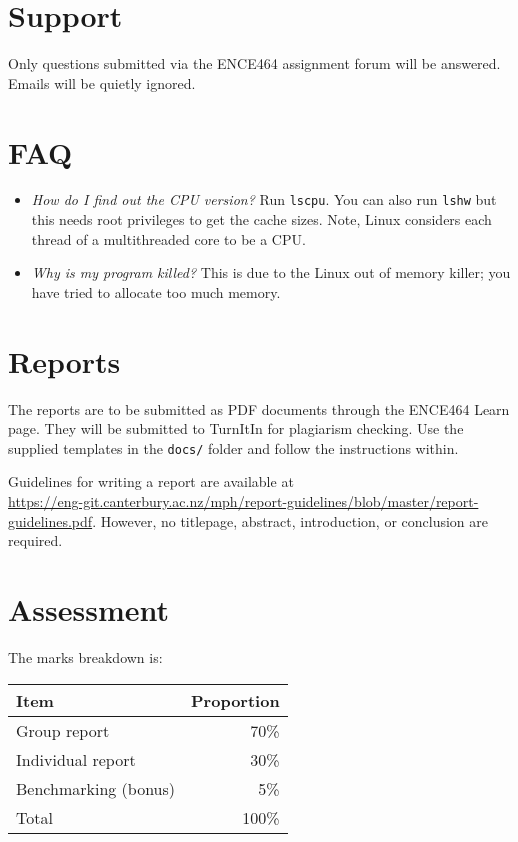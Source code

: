 \documentclass[a4paper,11pt]{article}
\newcommand{\code}[1]{\texttt{#1}}
\begin{document}

\section{Support}

Only questions submitted via the ENCE464 assignment forum will be
answered.  Emails will be quietly ignored.


\section{FAQ}

\begin{itemize}
\item \emph{How do I find out the CPU version?}  Run \code{lscpu}.
  You can also run \code{lshw} but this needs root privileges to get
  the cache sizes.  Note, Linux considers each thread of a
  multithreaded core to be a CPU.

\item \emph{Why is my program killed?}  This is due to the Linux out
  of memory killer; you have tried to allocate too much memory.

\end{itemize}



\section{Reports}

The reports are to be submitted as PDF documents through the ENCE464 
Learn page.  They will be submitted to TurnItIn for plagiarism checking.
Use the supplied templates in the \code{docs/} folder and follow the 
instructions within.

Guidelines for writing a report are available
at\\ \url{https://eng-git.canterbury.ac.nz/mph/report-guidelines/blob/master/report-guidelines.pdf}.
However, no titlepage, abstract, introduction, or conclusion are
required.


\section{Assessment}

The marks breakdown is:
\begin{flushleft}
  \begin{tabular}{|l|r|}
    \hline
    Item        & Proportion\\
    \hline
    Group report        & 70\%\\
    Individual report   & 30\%\\
    \hline
    Benchmarking (bonus)& 5\%\\
    \hline
    \hline
    Total               & 100\%\\
    \hline
  \end{tabular}
\end{flushleft}
\end{document}
